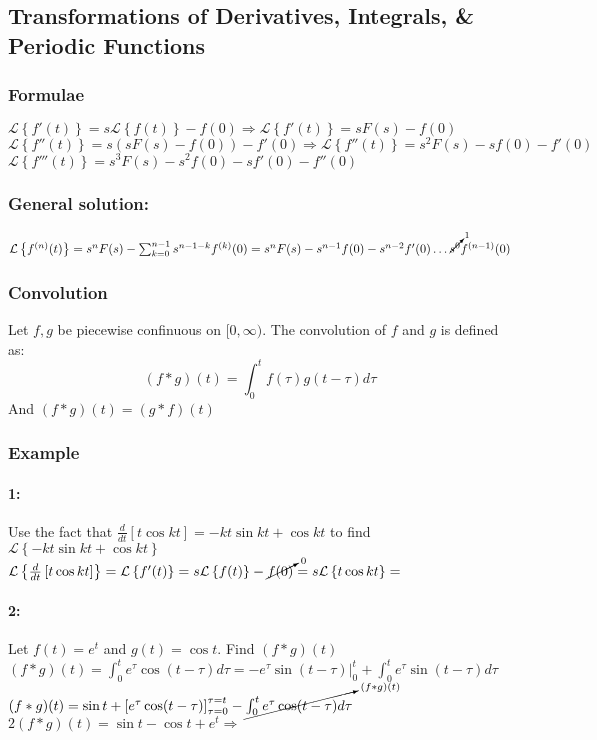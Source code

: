 \documentclass{article}
\begin{document}
\subsection{Transformations of Derivatives, Integrals, \& Periodic Functions}
\subsubsection{Formulae}
$\mathcal{L}\left\{f'(t)\right\}=s\mathcal{L}\left\{f(t)\right\}-f(0) \Rightarrow \mathcal{L}\left\{f'(t)\right\}=  sF(s)-f(0)$
\\$\mathcal{L}\left\{f''(t)\right\}=s(sF(s)-f(0))-f'(0) \Rightarrow \mathcal{L}\left\{f''(t)\right\}=s^2F(s)-sf(0)-f'(0) $
\\$\mathcal{L}\left\{f'''(t)\right\}=s^3F(s)-s^2f(0)-sf'(0)-f''(0)$
\\\subsubsection{General solution:} $\mathcal{L}\left\{f^{(n)}(t)\right\}=s^nF(s)-\sum_{k=0}^{n-1}s^{n-1-k}f^{(k)}(0)=s^nF(s)-s^{n-1}f(0)-s^{n-2}f'(0)\dots \cancelto{1}{s^0}f^{(n-1)}(0)$
\subsubsection{Convolution}
Let $f,g$ be piecewise confinuous on $[0,\infty)$. The convolution of $f$ and $g$ is defined as: $$(f*g)(t)=\int_{0}^{t}f(\tau)g(t-\tau)d\tau$$
And $(f*g)(t)=(g*f)(t)$
\subsubsection{Example}
\paragraph{1:} Use the fact that $\frac{d}{dt}\left[t\cos kt\right]= -kt\sin kt + \cos kt$ to find $\mathcal{L}\left\{-kt\sin kt + \cos kt\right\}$
\\$\mathcal{L}\left\{\frac{d}{dt}\left[t\cos kt\right]\right\}=\mathcal{L}\left\{f'(t)\right\}=s\mathcal{L}\left\{f(t)\right\}-\cancelto{0}{f(0)}=s\mathcal{L}\left\{t\cos kt\right\}=$
\\\paragraph{2:} Let $f(t)=e^t$ and $g(t)=\cos t$. Find $(f*g)(t)$
\\$(f*g)(t)=\int_{0}^{t}e^\tau \cos (t-\tau)d\tau=-e^\tau\sin(t-\tau)|_{0}^{t}+\int_{0}^{t}e^\tau\sin(t-\tau)d\tau$
\\$(f*g)(t)=\sin t+\left[e^\tau \cos (t-\tau)\right]_{\tau=0}^{\tau=t}-\cancelto{(f*g)(t)}{\int_{0}^{t}e^\tau \cos (t-\tau)d\tau}$
\\$2(f*g)(t)=\sin t-\cos t + e^t \Rightarrow$ 
\end{document}
